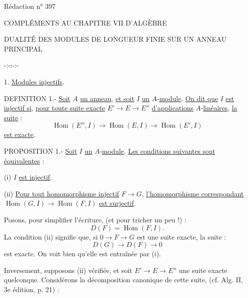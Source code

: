 \hfill Rédaction n° 397
\begin{center}
COMPLÉMENTS AU CHAPITRE VII D'ALGÈBRE

DUALITÉ DES MODULES DE LONGUEUR FINIE SUR UN ANNEAU PRINCIPAL

-:-:-:-
\end{center}

1. \uline{Modules injectifs}.

DEFINITION 1.- \uline{Soit} $A$ \uline{un anneau}, \uline{et soit} $I$ \uline{un} $A$-\uline{module}. \uline{On dit que} $I$ \uline{est injectif si}, \uline{pour toute suite exacte} $E'\longrightarrow E\longrightarrow E''$ \uline{d'applications} $A$-\uline{linéaires}, \uline{la suite} :
\[\operatorname{Hom}(E'',I)\longrightarrow\operatorname{Hom}(E,I)\longrightarrow\operatorname{Hom}(E',I)\]
\uline{est exacte}.

PROPOSITION 1.- \uline{Soit} $I$ \uline{un} $A$-\uline{module}. \uline{Les conditions suivantes sont équivalentes} :

(i) $I$ \uline{est injectif}.

(ii) \uline{Pour tout homomorphisme injectif} $F\longrightarrow G$, \uline{l'homomorphisme correspondant} $\operatorname{Hom}(G,I)\longrightarrow\operatorname{Hom}(F,I)$ \uline{est surjectif}.

Posons, pour simplifier l'écriture, (et pour tricher un peu !) :
\[D(F)=\operatorname{Hom}(F,I).\]
La condition (ii) signifie que, si $0\longrightarrow F\longrightarrow G$ est une suite exacte, la suite :
\[D(G)\longrightarrow D(F)\longrightarrow0\]
est exacte. On voit bien qu'elle est entraînée par (i).

Inversement, supposons (ii) vérifiée, et soit $E'\longrightarrow E\longrightarrow E''$ une suite exacte quelconque. Considérons la décomposition canonique de cette suite, (cf. Alg. II, 3e édition, p. 21) :
